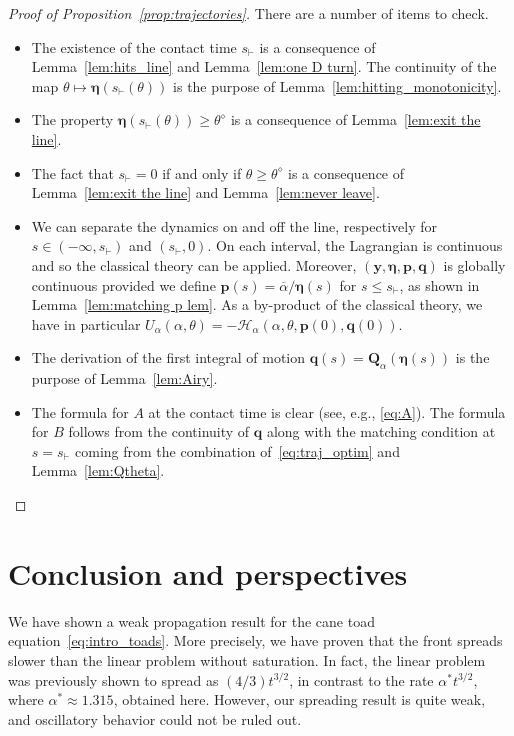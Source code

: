 \documentclass[AHL,Unicode,longabstracts]{cedram}
\newcommand{\bp}{\mathbf{p}}
\newcommand{\bq}{\mathbf{q}}
\newcommand{\bQ}{\mathbf{Q}}
\newcommand{\by}{\mathbf{y}}
\newcommand{\bH}{\mathscr{H}}
\newcommand{\beeta}{\boldsymbol{\eta}}
\newcommand{\1}{\mathds{1}}
\newcommand{\sh}{s_{\vdash}}
\newcommand{\Thetastar}{\theta^{\diamond}}
\newcommand{\shh}{s_{\vdash}}
\begin{document}
\begin{proof}[Proof of Proposition~\ref{prop:trajectories}]
There are a number of items to check.
\begin{itemize}
\item[\eqref{item:sh}] The existence of the contact time $\shh$ is a consequence of Lemma~\ref{lem:hits_line} and Lemma~\ref{lem:one D turn}. The continuity of the map $\theta\mapsto \beeta\left (\shh(\theta)\right)$ is the purpose of Lemma~\ref{lem:hitting_monotonicity}.
\item[\eqref{item:Q}] The property $\beeta(\shh(\theta)) \geq \Thetastar$ is a consequence of Lemma~\ref{lem:exit the line}.
\item[\eqref{item:sh=0}] The fact that $\shh = 0$ if and only if $\theta \geq \Thetastar$ is a consequence of Lemma~\ref{lem:exit the line} and Lemma~\ref{lem:never leave}.
\item[\eqref{item:continuous}] We can separate the dynamics on and off the line, respectively for $s\in (-\infty,\shh)$ and $(\shh,0)$. On each interval, the Lagrangian is continuous and so the classical theory can be applied. Moreover, $(\by,\beeta,\bp,\bq)$ is globally continuous provided we define $\bp(s) =\overline{\alpha}/\beeta(s) $ for $s\leq \shh$, as shown in Lemma~\ref{lem:matching p lem}. As a by-product of the classical theory, we have in particular $U_\alpha(\alpha,\theta) = - \bH_\alpha(\alpha,\theta,\bp(0),\bq(0))$.
\item[\eqref{item:after sh}] The derivation of the first integral of motion $\bq(s) = \bQ_\alpha(\beeta(s))$ is the purpose of Lemma~\ref{lem:Airy}.
\item[\eqref{item:A,B}] The formula for $A$ at the contact time is clear (see, e.g., \eqref{eq:A}). The formula for $B$ follows from the continuity of $\bq$ along with the matching condition at $s=\sh$ coming from the combination of~\eqref{eq:traj_optim} and Lemma~\ref{lem:Qtheta}.\qedhere
\end{itemize}
\end{proof}\let\qed\relax


\section{Conclusion and perspectives}

We have shown a weak propagation result for the cane toad equation~\eqref{eq:intro_toads}. More precisely, we have proven that the front spreads slower than the linear problem without saturation. In fact, the linear problem was previously shown to spread as $(4/3) t^{3/2}$, in contrast to the rate $\alpha^* t^{3/2}$, where $\alpha^* \approx 1.315$, obtained here. However, our spreading result is quite weak, and oscillatory behavior could not be ruled out.
\end{document}
